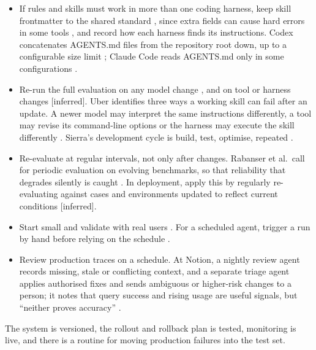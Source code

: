 \documentclass[10pt]{article}
\newcommand{\inferred}{\textsf{\small[inferred]}}
\begin{document}
\begin{itemize}
\item If rules and skills must work in more than one coding harness, keep skill frontmatter to the shared standard \cite[``Frontmatter'']{skillspec}, since extra fields can cause hard errors in some tools \cite[``Using skill frontmatter outside Claude Code'']{ccskills}, and record how each harness finds its instructions. Codex concatenates AGENTS.md files from the repository root down, up to a configurable size limit \cite[``How Codex discovers guidance'']{codexagents}; Claude Code reads AGENTS.md only in some configurations \cite[``When Claude Code reads AGENTS.md'']{ccmemory}.
\item Re-run the full evaluation on any model change \cite[p.~18]{gprod}, and on tool or harness changes \inferred. Uber identifies three ways a working skill can fail after an update. A newer model may interpret the same instructions differently, a tool may revise its command-line options or the harness may execute the skill differently \cite[``Continuous Improvement and Agents Filing Their Own Bugs'']{uberskills}. Sierra's development cycle is build, test, optimise, repeated \cite[p.~17]{brkdeploy}.
\item Re-evaluate at regular intervals, not only after changes. Rabanser et al.\ call for periodic evaluation on evolving benchmarks, so that reliability that degrades silently is caught \cite[\S5 and App.~A, Recommendation~1]{reliab}. In deployment, apply this by regularly re-evaluating against cases and environments updated to reflect current conditions \inferred.
\item Start small and validate with real users \cite[conclusion]{openai}. For a scheduled agent, trigger a run by hand before relying on the schedule \cite[Schedule]{anthauto}.
\item Review production traces on a schedule. At Notion, a nightly review agent records missing, stale or conflicting context, and a separate triage agent applies authorised fixes and sends ambiguous or higher-risk changes to a person; it notes that query success and rising usage are useful signals, but ``neither proves accuracy'' \cite[``Keeping data and business context current'', ``Seeing what the agent actually did'']{notion}.
\end{itemize}

\begin{gate}
The system is versioned, the rollout and rollback plan is tested, monitoring is live, and there is a routine for moving production failures into the test set.
\end{gate}
\end{document}
